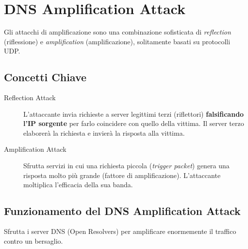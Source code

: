 \section{DNS Amplification Attack}

Gli attacchi di amplificazione sono una combinazione sofisticata di \textit{reflection} (riflessione) e \textit{amplification} (amplificazione), solitamente basati su protocolli UDP.

\subsection{Concetti Chiave}
\begin{description}
    \item[Reflection Attack] L'attaccante invia richieste a server legittimi terzi (riflettori) \textbf{falsificando l'IP sorgente} per farlo coincidere con quello della vittima. Il server terzo elaborerà la richiesta e invierà la risposta alla vittima.
    \item[Amplification Attack] Sfrutta servizi in cui una richiesta piccola (\textit{trigger packet}) genera una risposta molto più grande (fattore di amplificazione). L'attaccante moltiplica l'efficacia della sua banda.
\end{description}

\subsection{Funzionamento del DNS Amplification Attack}
Sfrutta i server DNS (Open Resolvers) per amplificare enormemente il traffico contro un bersaglio.

\begin{center}
\end{center}

